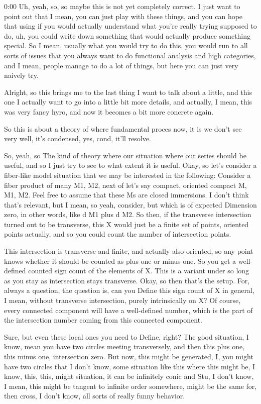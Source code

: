 \begin{unfinished}{0:00}
Uh, yeah, so, so maybe this is not yet completely correct. I just want to point out that I mean, you can just play with these things, and you can hope that using if you would actually understand what you're really trying supposed to do, uh, you could write down something that would actually produce something special. So I mean, usually what you would try to do this, you would run to all sorts of issues that you always want to do functional analysis and high categories, and I mean, people manage to do a lot of things, but here you can just very naively try.

Alright, so this brings me to the last thing I want to talk about a little, and this one I actually want to go into a little bit more details, and actually, I mean, this was very fancy hyro, and now it becomes a bit more concrete again. 

So this is about a theory of where fundamental proces now, it is we don't see very well, it's condensed, yes, cond, it'll resolve.

So, yeah, so
The kind of theory where our situation where our series should be useful, and so I just try to see to what extent it is useful. Okay, so let's consider a fiber-like model situation that we may be interested in the following: Consider a fiber product of many M1, M2, next of let's say compact, oriented compact M, M1, M2. Feel free to assume that these Ms are closed immersions. I don't think that's relevant, but I mean, so yeah, consider, but which is of expected Dimension zero, in other words, like d M1 plus d M2. So then, if the transverse intersection turned out to be transverse, this X would just be a finite set of points, oriented points actually, and so you could count the number of intersection points.

This intersection is transverse and finite, and actually also oriented, so any point knows whether it should be counted as plus one or minus one. So you get a well-defined counted sign count of the elements of X. This is a variant under so long as you stay as intersection stays transverse. Okay, so then that's the setup. For, always a question, the question is, can you Define this sign count of X in general, I mean, without transverse intersection, purely intrinsically on X? Of course, every connected component will have a well-defined number, which is the part of the intersection number coming from this connected component.

Sure, but even these local ones you need to Define, right? The good situation, I know, mean you have two circles meeting transversely, and then this plus one, this minus one, intersection zero. But now, this might be generated, I, you might have two circles that I don't know, some situation like this where this might be, I know, this, this, might situation, it can be infinitely conic and Stu, I don't know, I mean, this might be tangent to infinite order somewhere, might be the same for, then cross, I don't know, all sorts of really funny behavior.


\end{unfinished}
